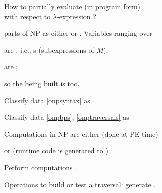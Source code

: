 \documentclass[12pt,fleqn,landscape]{article}
\begin{document}
\begin{slide}{How to partially evaluate   (in program form)\\ 
with respect to  $\lambda$-expression  ?}


\be

\item {}  parts of NP   as either  or . Variables ranging over
\vair

\be
\item\label{onpsyntax}  are , i.e., {\lexp}s \hfill (subexpressions of $M$);
\item\label{onpbps}  are ;
\item\label{onptraversals} so the  being built is  too.
\ee
\vair

\item Classify data \ref{onpsyntax} as   \hfill {}
\vair

\item Classify data \ref{onpbps},  \ref{onptraversals} as 
\hfill {}
\vair

\item Computations in NP are either   \hfill(done at PE time) 

or \hfill  {} (runtime code is generated to )
\bi
\item Perform  computations  .

\item Operations to build or test a traversal: generate  .
\ei

\ee


\end{slide}



\end{document}
